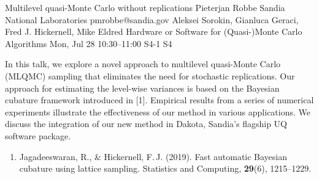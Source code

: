 \begin{talk}
  {Multilevel quasi-Monte Carlo without replications}%
  {Pieterjan Robbe}%
  {Sandia National Laboratories}%
  {pmrobbe@sandia.gov}%
  {Aleksei Sorokin, Gianluca Geraci, Fred J. Hickernell, Mike Eldred}%
  {Hardware or Software for (Quasi-)Monte Carlo Algorithms}%
  {Mon, Jul 28 10:30--11:00}%
  {S4-1}%
  {S4}%
    
   
In this talk, we explore a novel approach to multilevel quasi-Monte Carlo (MLQMC) sampling that eliminates the need for stochastic replications. Our approach for estimating the level-wise variances is based on the Bayesian cubature framework introduced in [1]. Empirical results from a series of numerical experiments illustrate the effectiveness of our method in various applications. We discuss the integration of our new method in Dakota, Sandia's flagship UQ software package.

\medskip

\begin{enumerate}
  \item[{[1]}] Jagadeeswaran, R., \& Hickernell, F.\,J. (2019). Fast automatic Bayesian cubature using lattice sampling. Statistics and Computing, \textbf{29}(6), 1215--1229.
\end{enumerate}

\end{talk}

